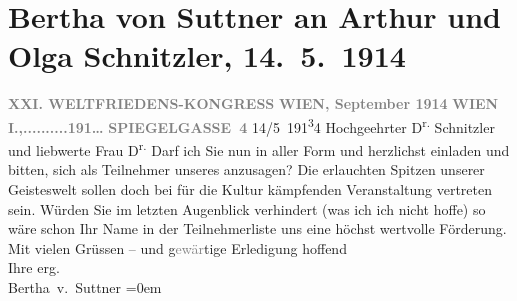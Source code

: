 

         
         \renewcommand{\erwaehntePersonen}{Personen: Olga Schnitzler}
         \renewcommand{\erwaehnteOrte}{Orte: I., Innere Stadt, Spiegelgasse, Wien}
         \renewcommand{\erwaehnteWerke}{}
               \section[Bertha von Suttner an Arthur und Olga Schnitzler, 14. 5. 1914]{ Bertha von Suttner an Arthur und Olga Schnitzler,
                    14. 5. 1914}\nopagebreak{}\rehead{ }\begin{ledgroupsized}[t]{13cm}\normalsize\beginnumbering \toendnotes[C]{\smallbreak\pagebreak[2]} 
\toendnotes[C]{\smallbreak}\pstart
           \noindent{}\centering{}{\pb}\textcolor{gray}{\textbf{XXI. WELTFRIEDENS-KONGRESS}}\pend
           \pstart
           \noindent{}\centering{}\textcolor{gray}{\textbf{WIEN, September 1914}}\pend
           \pstart
           \noindent{}\raggedleft{}\textcolor{gray}{\textbf{WIEN I.,..........191{\dots}}}\pend
           \pstart
           \noindent{}\raggedleft{}\textcolor{gray}{\textbf{SPIEGELGASSE 4}}\pend
           \pstart
           \raggedleft{}14/5 191\substVorne{}\textsuperscript{3}\substDazwischen{}4\substHinten{}\pend
           \pstart{}Hochgeehrter D\textsuperscript{r.} Schnitzler und liebwerte
                        Frau D\textsuperscript{r.}\pend\pstart
           Darf ich Sie nun in aller Form und herzlichst einladen und bitten, sich als
                    Teilnehmer unseres \label{K_L02179_1v}\label{K_L02179_1h} anzusagen? Die erlauchten Spitzen unserer Geisteswelt
                    sollen doch bei für die Kultur kämpfenden Veranstaltung
                    vertreten sein.\pend
           \pstart
           Würden Sie im letzten Augenblick verhindert (was ich ich nicht hoffe) so wäre
                    schon Ihr Name in der Teilnehmerliste uns eine höchst wertvolle Förderung.\pend
           \pstart
           Mit vielen Grüssen – und g\textcolor{gray}{ewär}tige Erledigung
                    hoffend{\\[\baselineskip]}Ihre erg.{\\[\baselineskip]}\spacefill\mbox{Bertha v. Suttner}\pend
           \leftskip=0em{}
         

\end{ledgroupsized}
